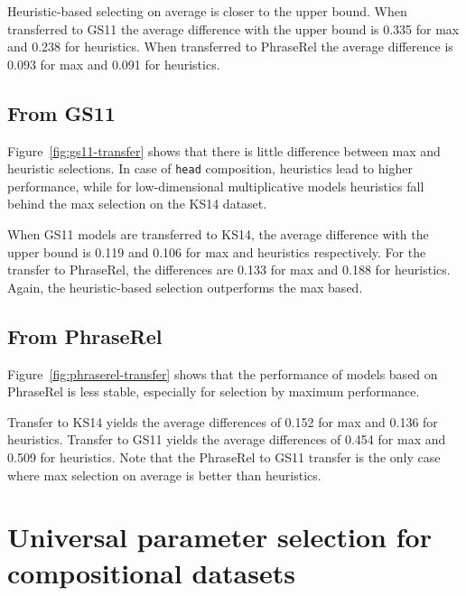 Heuristic-based selecting on average is closer to the upper bound. When transferred to GS11 the average difference with the upper bound is 0.335 for max and 0.238 for heuristics. When transferred to PhraseRel the average difference is 0.093 for max and 0.091 for heuristics.

\subsection{From GS11}
\label{sec:from-gs11}



Figure~\ref{fig:gs11-transfer} shows that there is little difference between max and heuristic selections. In case of \texttt{head} composition, heuristics lead to higher performance, while for low-dimensional multiplicative models heuristics fall behind the max selection on the KS14 dataset.

When GS11 models are transferred to KS14, the average difference with the upper bound is 0.119 and 0.106 for max and heuristics respectively. For the transfer to PhraseRel, the differences are 0.133 for max and 0.188 for heuristics. Again, the heuristic-based selection outperforms the max based.

\subsection{From PhraseRel}
\label{sec:from-phraserel}



Figure~\ref{fig:phraserel-transfer} shows that the performance of models based on PhraseRel is less stable, especially for selection by maximum performance.

Transfer to KS14 yields the average differences of 0.152 for max and 0.136 for heuristics. Transfer to GS11 yields the average differences of 0.454 for max and 0.509 for heuristics. Note that the PhraseRel to GS11 transfer is the only case where max selection on average is better than heuristics.


\section{Universal parameter selection for compositional datasets}
\label{sec:robust-param-comp-selecion}


